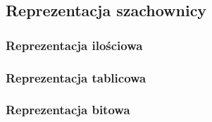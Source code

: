 \subsection{Reprezentacja szachownicy}
\label{subsec:reprezentacja-szachownicy}

\subsubsection{Reprezentacja ilościowa}

\subsubsection{Reprezentacja tablicowa}

\subsubsection{Reprezentacja bitowa}